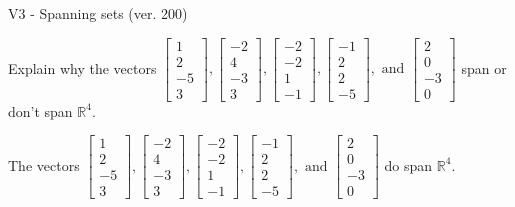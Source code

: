 \begin{exercise}
  \begin{exerciseTitle}V3 - Spanning sets (ver. 200)\end{exerciseTitle}
  \begin{exerciseStatement}
    Explain why the vectors \(\left[\begin{array}{r}
1 \\
2 \\
-5 \\
3
\end{array}\right] , \left[\begin{array}{r}
-2 \\
4 \\
-3 \\
3
\end{array}\right] , \left[\begin{array}{r}
-2 \\
-2 \\
1 \\
-1
\end{array}\right] , \left[\begin{array}{r}
-1 \\
2 \\
2 \\
-5
\end{array}\right] , \text{ and } \left[\begin{array}{r}
2 \\
0 \\
-3 \\
0
\end{array}\right]\) span or don't span \(\mathbb{R}^4\). 
	


  \end{exerciseStatement}
  \begin{exerciseAnswer}
   The vectors \(\left[\begin{array}{r}
1 \\
2 \\
-5 \\
3
\end{array}\right] , \left[\begin{array}{r}
-2 \\
4 \\
-3 \\
3
\end{array}\right] , \left[\begin{array}{r}
-2 \\
-2 \\
1 \\
-1
\end{array}\right] , \left[\begin{array}{r}
-1 \\
2 \\
2 \\
-5
\end{array}\right] , \text{ and } \left[\begin{array}{r}
2 \\
0 \\
-3 \\
0
\end{array}\right]\) 
  	 do  
	span \(\mathbb{R}^4\).
  



\end{exerciseAnswer}
\end{exercise}
